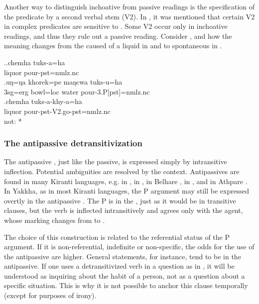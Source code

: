 Another way to distinguish inchoative from passive readings is the specification of the predicate by a second verbal stem (V2). In , it was mentioned that certain V2 in complex predicates are sensitive to . Some V2 occur only in inchoative readings, and thus they rule out a  passive reading. Consider \Next, and how the meaning changes from the caused  of a liquid in \Next[a] and \Next[b] to spontaneous  in \Next[c].

\ex.\ag.chemha tuks-a=ha\\
liquor pour{\sc [3sg]-pst=nmlz.nc} \\
\bg.uŋ=ŋa khorek=pe maŋcwa tuks-u=ha\\
{\sc 3sg=erg} bowl{\sc =loc} water pour{\sc -3.P[pst]=nmlz.nc}\\
\bg.chemha tuks-a-khy-a=ha\\
liquor pour{\sc [3sg]-pst-V2.go-pst=nmlz.nc} \\
 not: *


\subsubsection{The antipassive detransitivization}\label{detr-antip}

The antipassive , just like the passive, is expressed simply by intransitive inflection. Potential ambiguities are  resolved by the context. Antipassives are  found in many Kiranti languages, e.g. in , in , in Belhare \citep{Bickel2011Detrans, Schikowski2013_Thesis}, in  \citep[221ff.]{Doornenbal2009A-grammar}, and in Athpare \citep[122]{Ebert1997A-grammar}. In Yakkha, as in most Kiranti languages, the P argument may still be expressed overtly in the antipassive . The P is in the , just as it would be in transitive clauses, but the verb is inflected intransitively and agrees only with the agent, whose  marking changes from  to .

The choice of this construction is related to the referential status of the P argument. If it is non-referential, indefinite or non-specific, the odds for the use of the antipassive are higher. General statements, for instance,  tend to be in the antipassive. If one uses a detransitivized verb in a question as in \Next, it will be understood as inquiring about the habit of a person, not as a question about a specific situation. This is why it is not possible to anchor this clause temporally (except for purposes of irony). 

